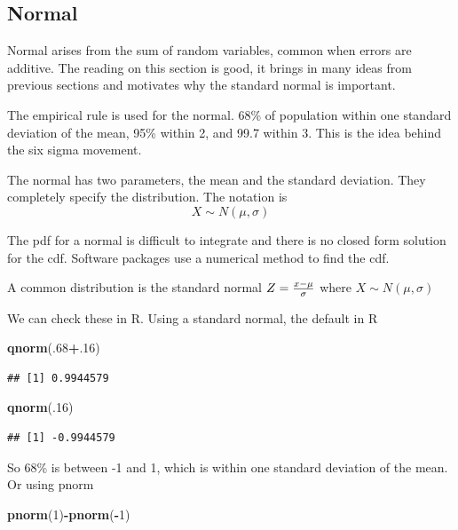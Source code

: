 \documentclass[]{book}
\newenvironment{Shaded}{\begin{snugshade}}{\end{snugshade}}
\newcommand{\KeywordTok}[1]{\textcolor[rgb]{0.13,0.29,0.53}{\textbf{#1}}}
\newcommand{\DecValTok}[1]{\textcolor[rgb]{0.00,0.00,0.81}{#1}}
\newcommand{\OperatorTok}[1]{\textcolor[rgb]{0.81,0.36,0.00}{\textbf{#1}}}
\newcommand{\NormalTok}[1]{#1}
\theoremstyle{definition}
\theoremstyle{definition}
\theoremstyle{definition}
\theoremstyle{remark}
\begin{document}
\subsection{Normal}\label{normal}

Normal arises from the sum of random variables, common when errors are
additive. The reading on this section is good, it brings in many ideas
from previous sections and motivates why the standard normal is
important.

The empirical rule is used for the normal. 68\% of population within one
standard deviation of the mean, 95\% within 2, and 99.7 within 3. This
is the idea behind the six sigma movement.

The normal has two parameters, the mean and the standard deviation. They
completely specify the distribution. The notation is
\[X \sim N(\mu,\sigma)\]

The pdf for a normal is difficult to integrate and there is no closed
form solution for the cdf. Software packages use a numerical method to
find the cdf.

A common distribution is the standard normal
\(Z={x - \mu \over \sigma}\) where \(X \sim N(\mu,\sigma)\)

We can check these in R. Using a standard normal, the default in R

\begin{Shaded}
\begin{Highlighting}[]
\KeywordTok{qnorm}\NormalTok{(.}\DecValTok{68}\OperatorTok{+}\NormalTok{.}\DecValTok{16}\NormalTok{)}
\end{Highlighting}
\end{Shaded}

\begin{verbatim}
## [1] 0.9944579
\end{verbatim}

\begin{Shaded}
\begin{Highlighting}[]
\KeywordTok{qnorm}\NormalTok{(.}\DecValTok{16}\NormalTok{)}
\end{Highlighting}
\end{Shaded}

\begin{verbatim}
## [1] -0.9944579
\end{verbatim}

So 68\% is between -1 and 1, which is within one standard deviation of
the mean. Or using pnorm

\begin{Shaded}
\begin{Highlighting}[]
\KeywordTok{pnorm}\NormalTok{(}\DecValTok{1}\NormalTok{)}\OperatorTok{-}\KeywordTok{pnorm}\NormalTok{(}\OperatorTok{-}\DecValTok{1}\NormalTok{)}
\end{Highlighting}
\end{Shaded}
\end{document}
